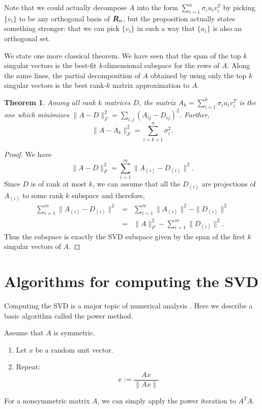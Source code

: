 \documentclass{book}
\newtheorem{theorem}{Theorem}[chapter]
\numberwithin{exercise}{chapter}
\begin{document}
Note that we could
actually decompose $A$ into the form $\sum_{i=1}^n \sigma_i u_i
v_i^T$ by picking $\{v_i\}$ to be any orthogonal basis of $\mbox{\mbox{\boldmath $R$}}_n$, but
the proposition actually states something stronger: that we can pick
$\{v_i\}$ in such a way that $\{u_i\}$ is also an orthogonal set.

We state one more classical theorem.  We have seen that the span of the top
$k$ singular vectors is the best-fit $k$-dimensional subspace for
the rows of $A$.  Along the same lines, the partial
decomposition of $A$ obtained by using only the top $k$ singular
vectors is the best rank-$k$ matrix approximation to $A$.

\begin{theorem}\label{svdFrob}
Among all rank $k$ matrices $D$, the matrix $A_k = \sum_{i=1}^k
\sigma_i u_i v_i^T $ is the one which minimizes
$\|A-D \|_F^2 = \sum_{i,j} (A_{ij} - D_{ij})^2$. Further,
\[
\|A - A_k\|_F^2 = \sum_{i=k+1}^n \sigma_i^2.
\]
\end{theorem}

\begin{proof}
We have
\[
\|A-D \|_F^2 = \sum_{i=1}^m \|A_{(i)} - D_{(i)}\|^2.
\]
Since $D$ is of rank at most $k$, we can assume that all the $D_{(i)}$ are
projections of $A_{(i)}$ to some rank $k$ subspace and therefore,
\begin{eqnarray*}
\sum_{i=1}^m \|A_{(i)} - D_{(i)}\|^2 &=& \sum_{i=1}^m\|A_{(i)}\|^2 - \|D_{(i)}\|^2\\
&=& \|A\|_F^2 - \sum_{i=1}^m \|D_{(i)}\|^2.
\end{eqnarray*}
Thus the subspace is exactly the SVD subspace given by the span of the first $k$ singular vectors of $A$.
\end{proof}

\section{Algorithms for computing the SVD}

Computing the SVD is a major topic of numerical analysis \cite{Strang, GolubVanLoan, Wilkinson}.
Here we describe a basic algorithm called the power method.

Assume that $A$ is symmetric.
\begin{enumerate}
\item Let $x$ be a random unit vector.
\item Repeat:
\[
x:= \frac{Ax}{\|Ax\|}
\]
\end{enumerate}
For a nonsymmetric matrix $A$, we can simply apply the power iteration to $A^TA$.
\end{document}
